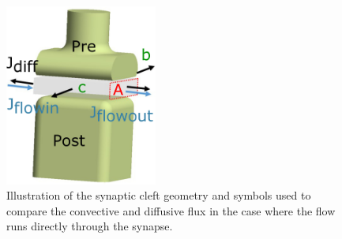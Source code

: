 \begin{figure}
      \centering
      \includegraphics[width=5cm]{chapter5/figures/synapse/synapseIllustration.jpg}
      \caption[Illustration of a synaptic cleft with flow running through it]{Illustration of the synaptic cleft geometry and symbols used to compare the convective and diffusive flux in the case where the flow runs directly through the synapse.}
      \label{fig:crossFlow:synapse}
\end{figure}

